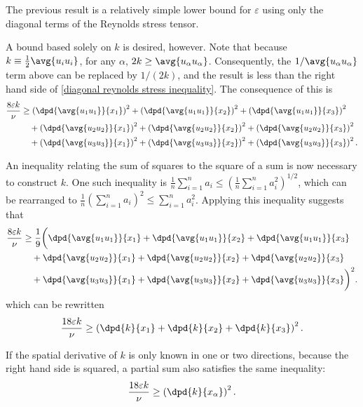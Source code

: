 \documentclass[ccbysa,note]{bmtreport}
\begin{document}
The previous result is a relatively simple lower bound for $\varepsilon$ using only the diagonal terms of the Reynolds stress tensor.

A bound based solely on $k$ is desired, however. Note that because $k \equiv \tfrac{1}{2} \avg{u_i u_i}$, for any $\alpha$, $2 k \geq \avg{u_\alpha u_\alpha}$. Consequently, the $1 / \avg{u_\alpha u_\alpha}$ term above can be replaced by $1 / (2 k)$, and the result is less than the right hand side of \eqref{diagonal reynolds stress inequality}. The consequence of this is
\begin{align}
   \frac{8 \varepsilon k}{\nu} &\geq \left(\dpd{\avg{u_1 u_1}}{x_1}\right)^2 + \left(\dpd{\avg{u_1 u_1}}{x_2}\right)^2 + \left(\dpd{\avg{u_1 u_1}}{x_3}\right)^2 \notag \\
                             &\quad + \left(\dpd{\avg{u_2 u_2}}{x_1}\right)^2 + \left(\dpd{\avg{u_2 u_2}}{x_2}\right)^2 + \left(\dpd{\avg{u_2 u_2}}{x_3}\right)^2 \notag \\
                             &\quad + \left(\dpd{\avg{u_3 u_3}}{x_1}\right)^2 + \left(\dpd{\avg{u_3 u_3}}{x_2}\right)^2 + \left(\dpd{\avg{u_3 u_3}}{x_3}\right)^2.
\end{align}

An inequality relating the sum of squares to the square of a sum is now necessary to construct $k$. One such inequality is $\tfrac{1}{n} \sum_{i = 1}^n a_i \leq \left(\tfrac{1}{n} \sum_{i = 1}^n a_i^2\right)^{1/2}$, which can be rearranged to $\tfrac{1}{n} \left(\sum_{i = 1}^n a_i\right)^2 \leq \sum_{i = 1}^n a_i^2$. Applying this inequality suggests that
\begin{align}
   \frac{8 \varepsilon k}{\nu} &\geq \frac{1}{9} \bigg(\dpd{\avg{u_1 u_1}}{x_1} + \dpd{\avg{u_1 u_1}}{x_2} + \dpd{\avg{u_1 u_1}}{x_3} \notag \\
                             &\quad + \dpd{\avg{u_2 u_2}}{x_1} + \dpd{\avg{u_2 u_2}}{x_2} + \dpd{\avg{u_2 u_2}}{x_3} \notag \\
                             &\quad + \dpd{\avg{u_3 u_3}}{x_1} + \dpd{\avg{u_3 u_3}}{x_2} + \dpd{\avg{u_3 u_3}}{x_3}\bigg)^2.
\end{align}
which can be rewritten
\begin{equation}
   \frac{18 \varepsilon k}{\nu} \geq \left(\dpd{k}{x_1} + \dpd{k}{x_2} + \dpd{k}{x_3}\right)^2.
\end{equation}

If the spatial derivative of $k$ is only known in one or two directions, because the right hand side is squared, a partial sum also satisfies the same inequality:
\begin{equation}
   \frac{18 \varepsilon k}{\nu} \geq \left(\dpd{k}{x_\alpha}\right)^2.
\end{equation}
\end{document}
